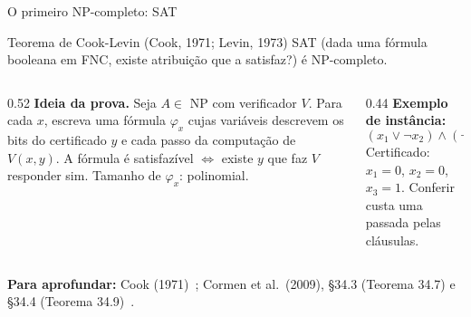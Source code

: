\documentclass[aspectratio=169,xcolor=table]{beamer}
\newcommand{\fonte}[1]{%
  \vfill
  {\tiny\color{gray!55!black}\textbf{Para aprofundar:} #1\par}%
}
\newcommand{\prob}[1]{\textsc{#1}}
\begin{document}
\begin{frame}{O primeiro NP-completo: SAT}
  \begin{block}{Teorema de Cook-Levin (Cook, 1971; Levin, 1973)}
    \small
    \prob{SAT} (dada uma fórmula booleana em FNC, existe atribuição que a satisfaz?) é
    NP-completo.
  \end{block}
  \begin{columns}[T]
    \begin{column}{0.52\textwidth}
      \scriptsize
      \textbf{Ideia da prova.} Seja $A \in$ NP com verificador $V$. Para cada $x$, escreva
      uma fórmula $\varphi_x$ cujas variáveis descrevem os bits do certificado $y$ e cada
      passo da computação de $V(x, y)$. A fórmula é satisfazível $\iff$ existe $y$ que faz
      $V$ responder sim. Tamanho de $\varphi_x$: polinomial.
    \end{column}
    \begin{column}{0.44\textwidth}
      \scriptsize
      \textbf{Exemplo de instância:}
      \[
        (x_1 \lor \lnot x_2) \land (\lnot x_1 \lor x_2 \lor x_3) \land (\lnot x_3 \lor \lnot x_1)
      \]
      Certificado: $x_1 = 0$, $x_2 = 0$, $x_3 = 1$. Conferir custa uma passada pelas
      cláusulas.
    \end{column}
  \end{columns}
  \fonte{Cook (1971)~\cite{cook1971complexity};
    Cormen et al.\ (2009), \S 34.3 (Teorema 34.7) e \S 34.4 (Teorema 34.9)~\cite{cormen2009introduction}.}
\end{frame}
\end{document}
